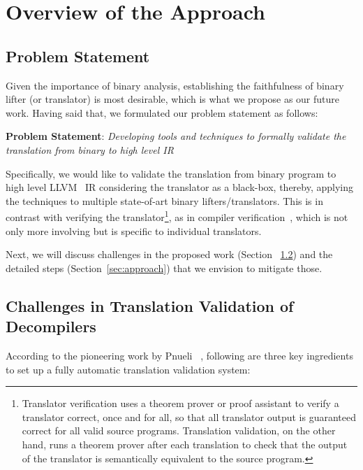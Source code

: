 \chapter{Overview of the Approach}\label{sec:overview}
\section{Problem Statement}\label{sec:statement}


Given the importance of binary analysis, establishing the faithfulness of
binary lifter (or translator) is most desirable, which is what we propose as
our future work. Having said that, we formulated our problem statement as
follows:

\vspace{10pt}

\noindent\textbf{Problem Statement}: \emph{Developing
   tools and techniques to formally validate the
    translation from binary to high level IR}

Specifically, we would like to validate the translation from \ISA binary
program  to high level LLVM~\cite{LLVM:CGO04} IR considering the translator as
a black-box, thereby, applying the techniques to multiple state-of-art binary
lifters/translators. This is in contrast with  verifying the
translator\footnote{Translator verification uses a theorem prover or proof
  assistant to verify a translator correct, once and for all, so that all
    translator output is guaranteed correct for all valid source programs.
    Translation validation, on the other hand, runs a theorem prover after each
    translation to check that the output of the translator is semantically
    equivalent to the source program.}, as in  compiler
    verification~\cite{Leroy:2009}, which is not only more involving but is
    specific to individual translators.

Next, we will discuss challenges in the proposed work (Section
    ~\ref{sec:challenges}) and the detailed steps (Section~\ref{sec:approach})
that we envision to mitigate those.

\section{Challenges in Translation Validation of
  Decompilers}\label{sec:challenges} According to the pioneering work by Pnueli
  \etal ~\cite{Pnueli:1998}, following are three key ingredients to set up a
  fully automatic translation validation system:


